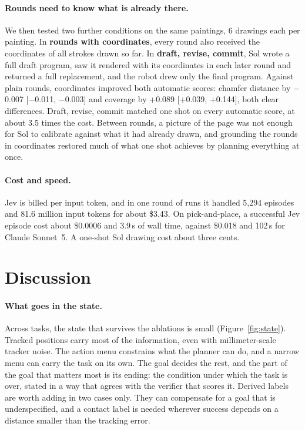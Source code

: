 \documentclass[11pt]{article}
\begin{document}
\paragraph{Rounds need to know what is already there.} We then tested two further conditions on the same paintings, 6 drawings each per painting. In \textbf{rounds with coordinates}, every round also received the coordinates of all strokes drawn so far. In \textbf{draft, revise, commit}, Sol wrote a full draft program, saw it rendered with its coordinates in each later round and returned a full replacement, and the robot drew only the final program. Against plain rounds, coordinates improved both automatic scores: chamfer distance by $-$0.007 [$-$0.011, $-$0.003] and coverage by +0.089 [+0.039, +0.144], both clear differences. Draft, revise, commit matched one shot on every automatic score, at about 3.5 times the cost. Between rounds, a picture of the page was not enough for Sol to calibrate against what it had already drawn, and grounding the rounds in coordinates restored much of what one shot achieves by planning everything at once.

\paragraph{Cost and speed.} Jev is billed per input token, and in one round of runs it handled 5,294 episodes and 81.6 million input tokens for about \$3.43. On pick-and-place, a successful Jev episode cost about \$0.0006 and 3.9\,s of wall time, against \$0.018 and 102\,s for Claude Sonnet~5. A one-shot Sol drawing cost about three cents.
\clearpage
\section{Discussion}
\label{sec:discussion}



\paragraph{What goes in the state.} Across tasks, the state that survives the ablations is small (Figure~\ref{fig:state}). Tracked positions carry most of the information, even with millimeter-scale tracker noise. The action menu constrains what the planner can do, and a narrow menu can carry the task on its own. The goal decides the rest, and the part of the goal that matters most is its ending: the condition under which the task is over, stated in a way that agrees with the verifier that scores it. Derived labels are worth adding in two cases only. They can compensate for a goal that is underspecified, and a contact label is needed wherever success depends on a distance smaller than the tracking error.
\end{document}
